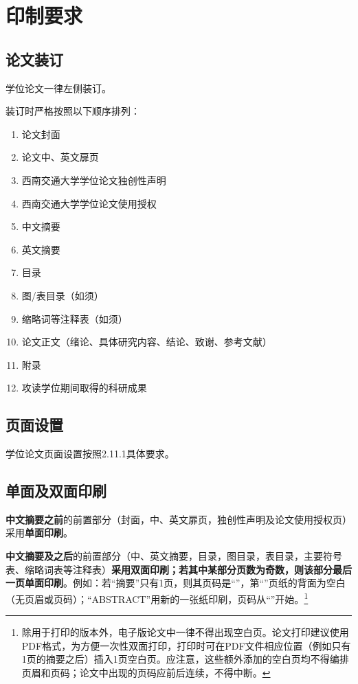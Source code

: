 \chapter{印制要求}\label{第3章}

\section{论文装订}

学位论文一律左侧装订。

装订时严格按照以下顺序排列：

\begin{enumerate}
    \item 论文封面
    \item 论文中、英文扉页
    \item 西南交通大学学位论文独创性声明
    \item 西南交通大学学位论文使用授权
    \item 中文摘要
    \item 英文摘要
    \item 目录
    \item 图/表目录（如须）
    \item 缩略词等注释表（如须）
    \item 论文正文（绪论、具体研究内容、结论、致谢、参考文献）
    \item 附录
    \item 攻读学位期间取得的科研成果
\end{enumerate}

\section{页面设置}

学位论文页面设置按照2.11.1具体要求。

\section{单面及双面印刷}

\textbf{中文摘要之前}的前置部分（封面，中、英文扉页，独创性声明及论文使用授权页）采用\textbf{单面印刷}。

\textbf{中文摘要及之后}的前置部分（中、英文摘要，目录，图目录，表目录，主要符号表、缩略词表等注释表）\textbf{采用双面印刷；若其中某部分页数为奇数，则该部分最后一页单面印刷}。例如：若“摘要”只有1页，则其页码是“\uppercase\expandafter{}”，第“\uppercase\expandafter{}”页纸的背面为空白（无页眉或页码）；“ABSTRACT”用新的一张纸印刷，页码从“\uppercase\expandafter{}”开始。\footnote{除用于打印的版本外，电子版论文中一律不得出现空白页。论文打印建议使用PDF格式，为方便一次性双面打印，打印时可在PDF文件相应位置（例如只有1页的摘要之后）插入1页空白页。应注意，这些额外添加的空白页均不得编排页眉和页码；论文中出现的页码应前后连续，不得中断。}

